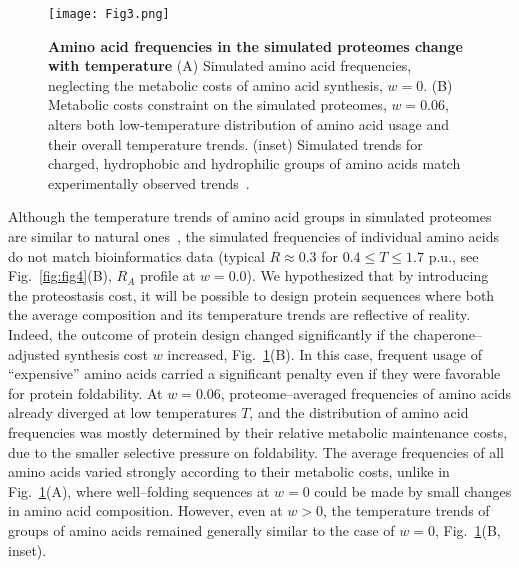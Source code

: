 \documentclass[10pt,letterpaper]{article}
\begin{document}
\begin{figure}[h!]
\texttt{[image: Fig3.png]}
\caption{
{\bf Amino acid frequencies in the simulated proteomes change with temperature} (A) Simulated amino acid frequencies, neglecting the metabolic costs of amino acid synthesis, $w=0$.  (B) Metabolic costs constraint on the simulated proteomes, $w=0.06$, alters both low-temperature distribution of amino acid usage and their overall temperature trends. (inset) Simulated trends for charged, hydrophobic and hydrophilic groups of amino acids match experimentally observed trends~\cite{Berezovsky2007Positive}.
}
\label{fig:fig3}
\end{figure}

Although the temperature trends of amino acid groups in simulated proteomes are similar to natural ones~\cite{Berezovsky2007Positive,Venev2015Massively}, the simulated frequencies of individual amino acids do not match bioinformatics data (typical $R\approx0.3$ for $0.4\leq T\leq 1.7$ p.u., see Fig.~\ref{fig:fig4}(B), $R_A$ profile at $w=0.0$). We hypothesized that by introducing the proteostasis cost, it will be possible to design protein sequences where both the average composition and its temperature trends are reflective of reality. Indeed, the outcome of protein design changed significantly if the chaperone--adjusted synthesis cost $w$ increased, Fig.~\ref{fig:fig3}(B). In this case, frequent usage of ``expensive'' amino acids carried a significant penalty even if they were favorable for protein foldability. At $w=0.06$, proteome--averaged frequencies of amino acids already diverged at low temperatures $T$, and the distribution of amino acid frequencies was mostly determined by their relative metabolic maintenance costs, due to the smaller selective pressure on foldability. The average frequencies of all amino acids varied strongly according to their metabolic costs, unlike in Fig.~\ref{fig:fig3}(A), where well--folding sequences at $w=0$ could be made by small changes in amino acid composition. However, even at $w>0$, the temperature trends of groups of amino acids remained generally similar to the case of $w=0$, Fig.~\ref{fig:fig3}(B, inset).
\end{document}

